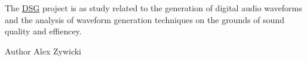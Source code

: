 The \hyperlink{namespaceDSG}{D\+S\+G} project is as study related to the generation of digital audio waveforms and the analysis of waveform generation techniques on the grounds of sound quality and effiencey. \begin{DoxyAuthor}{Author}
Alex Zywicki 
\end{DoxyAuthor}
